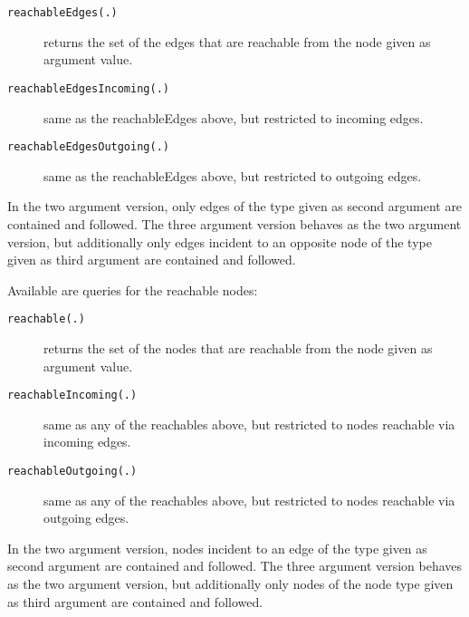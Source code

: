 \begin{description}
\item[\texttt{reachableEdges(.)}] returns the set of the edges that are reachable from the node given as argument value.
\item[\texttt{reachableEdgesIncoming(.)}] same as the reachableEdges above, but restricted to incoming edges.
\item[\texttt{reachableEdgesOutgoing(.)}] same as the reachableEdges above, but restricted to outgoing edges.
\end{description}

In the two argument version, only edges of the type given as second argument are contained and followed.
The three argument version behaves as the two argument version, but additionally only edges incident to an opposite node of the type given as third argument are contained and followed.

Available are queries for the reachable nodes:

\begin{description}
\item[\texttt{reachable(.)}] returns the set of the nodes that are reachable from the node given as argument value.
\item[\texttt{reachableIncoming(.)}] same as any of the reachables above, but restricted to nodes reachable via incoming edges.
\item[\texttt{reachableOutgoing(.)}] same as any of the reachables above, but restricted to nodes reachable via outgoing edges.
\end{description}

In the two argument version, nodes incident to an edge of the type given as second argument are contained and followed.
The three argument version behaves as the two argument version, but additionally only nodes of the node type given as third argument are contained and followed.

